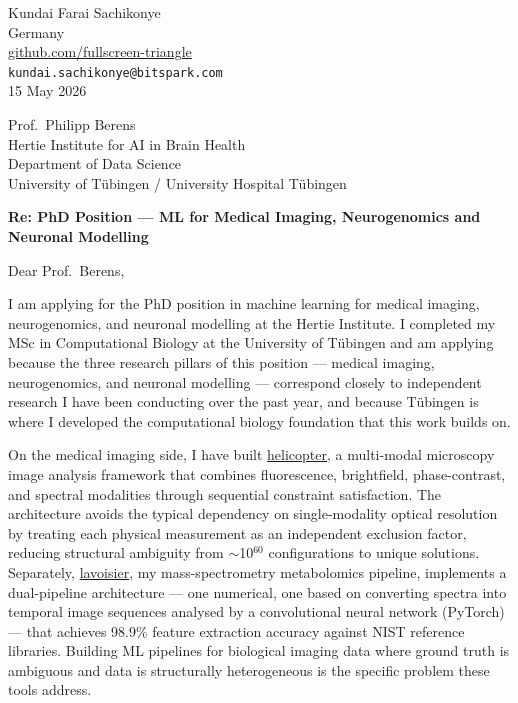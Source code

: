\documentclass[12pt,a4paper]{article}
\begin{document}
\begin{flushright}
Kundai Farai Sachikonye \\
Germany \\
\href{https://github.com/fullscreen-triangle}{github.com/fullscreen-triangle} \\
\texttt{kundai.sachikonye@bitspark.com} \\[6pt]
15 May 2026
\end{flushright}

\vspace{1em}

Prof.\ Philipp Berens \\
Hertie Institute for AI in Brain Health \\
Department of Data Science \\
University of Tübingen / University Hospital Tübingen

\vspace{1.5em}

\textbf{Re: PhD Position --- ML for Medical Imaging, Neurogenomics and Neuronal Modelling}

\vspace{1em}

Dear Prof.\ Berens,

I am applying for the PhD position in machine learning for medical imaging,
neurogenomics, and neuronal modelling at the Hertie Institute. I completed
my MSc in Computational Biology at the University of Tübingen and am applying
because the three research pillars of this position --- medical imaging, neurogenomics,
and neuronal modelling --- correspond closely to independent research I have been
conducting over the past year, and because Tübingen is where I developed the
computational biology foundation that this work builds on.

On the medical imaging side, I have built
\href{https://github.com/fullscreen-triangle/helicopter}{helicopter}, a multi-modal
microscopy image analysis framework that combines fluorescence, brightfield,
phase-contrast, and spectral modalities through sequential constraint satisfaction.
The architecture avoids the typical dependency on single-modality optical resolution
by treating each physical measurement as an independent exclusion factor, reducing
structural ambiguity from $\sim$10$^{60}$ configurations to unique solutions. Separately,
\href{https://github.com/fullscreen-triangle/lavoisier}{lavoisier}, my mass-spectrometry
metabolomics pipeline, implements a dual-pipeline architecture --- one numerical, one
based on converting spectra into temporal image sequences analysed by a convolutional
neural network (PyTorch) --- that achieves 98.9\% feature extraction accuracy against
NIST reference libraries. Building ML pipelines for biological imaging data where ground
truth is ambiguous and data is structurally heterogeneous is the specific problem these
tools address.
\end{document}
